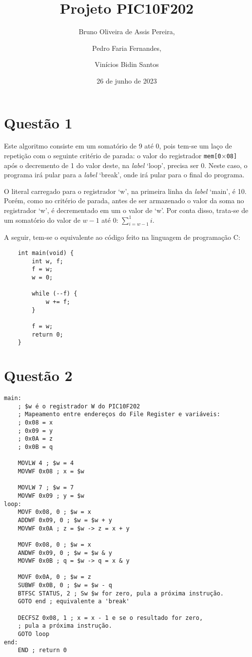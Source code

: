 \documentclass[12pt]{report}
\title{Projeto PIC10F202}
\author{Bruno Oliveira de Assis Pereira,\and Pedro Faria Fernandes,\and Vinícios Bidin Santos}
\date{26 de junho de 2023}
\begin{document}
	\maketitle
	\section*{Questão 1}
		Este algoritmo consiste em um somatório de 9 até 0, pois tem-se um laço de repetição com o seguinte critério de parada: o valor do registrador \texttt{mem[0$\times$08]}
		após o decremento de 1 do valor deste, na \textit{label} `loop', precisa ser 0. Neste caso, o programa irá pular para a \textit{label} `break', onde irá pular para o final do programa.

		O literal carregado para o registrador `w', na primeira linha da \textit{label} `main', é 10. Porém, como no critério de parada, antes de ser armazenado o valor da soma no registrador `w', é decrementado em um o valor de `w'. Por conta disso, trata-se de um somatório do valor de $w - 1$ até 0: $\sum\limits_{i=w-1}^{1}i$.

		A seguir, tem-se o equivalente ao código feito na linguagem de programação C:\@
	\begin{verbatim}
	int main(void) {
		int w, f;
		f = w;
		w = 0;

		while (--f) {
			w += f;
		}

		f = w;
		return 0;
	}
	\end{verbatim}
	\clearpage
	\section*{Questão 2}
		\begin{verbatim}
main:
    ; $w é o registrador W do PIC10F202
    ; Mapeamento entre endereços do File Register e variáveis: 
    ; 0x08 = x
    ; 0x09 = y
    ; 0x0A = z
    ; 0x0B = q

    MOVLW 4 ; $w = 4
    MOVWF 0x08 ; x = $w

    MOVLW 7 ; $w = 7
    MOVWF 0x09 ; y = $w
loop:
    MOVF 0x08, 0 ; $w = x
    ADDWF 0x09, 0 ; $w = $w + y
    MOVWF 0x0A ; z = $w -> z = x + y
		
    MOVF 0x08, 0 ; $w = x
    ANDWF 0x09, 0 ; $w = $w & y
    MOVWF 0x0B ; q = $w -> q = x & y
		
    MOVF 0x0A, 0 ; $w = z
    SUBWF 0x0B, 0 ; $w = $w - q
    BTFSC STATUS, 2 ; Sw $w for zero, pula a próxima instrução. 
    GOTO end ; equivalente a 'break'
		
    DECFSZ 0x08, 1 ; x = x - 1 e se o resultado for zero,
    ; pula a próxima instrução.
    GOTO loop
end:
    END ; return 0
		\end{verbatim}
\end{document}
